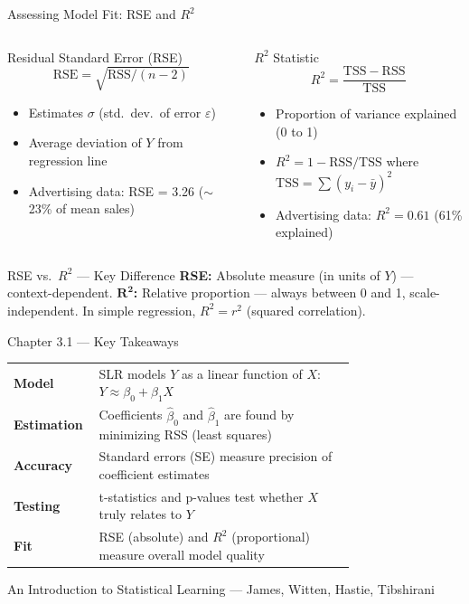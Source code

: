 \documentclass[ignorenonframetext,]{beamer}
\begin{document}
\begin{frame}{Assessing Model Fit: RSE and $R^2$}
\begin{columns}[T]
\begin{block}{Residual Standard Error (RSE)}
\footnotesize
$$\mathrm{RSE} = \sqrt{\mathrm{RSS}/(n-2)}$$
\begin{itemize}
\item Estimates $\sigma$ (std.\ dev.\ of error $\varepsilon$)
\item Average deviation of $Y$ from regression line
\item Advertising data: RSE = 3.26 ($\sim$23\% of mean sales)
\end{itemize}
\end{block}
\begin{block}{$R^2$ Statistic}
\footnotesize
$$R^2 = \frac{\mathrm{TSS} - \mathrm{RSS}}{\mathrm{TSS}}$$
\begin{itemize}
\item Proportion of variance explained (0 to 1)
\item $R^2 = 1 - \mathrm{RSS}/\mathrm{TSS}$ where $\mathrm{TSS} = \sum (y_i - \bar{y})^2$
\item Advertising data: $R^2 = 0.61$ (61\% explained)
\end{itemize}
\end{block}
\end{columns}

\begin{block}{RSE vs.\ $R^2$ --- Key Difference}
\footnotesize
\textbf{RSE:} Absolute measure (in units of $Y$) --- context-dependent. \textbf{$\bm{R^2}$:} Relative proportion --- always between 0 and 1, scale-independent. In simple regression, $R^2 = r^2$ (squared correlation).
\end{block}
\end{frame}

\begin{frame}{Chapter 3.1 --- Key Takeaways}
\renewcommand{\arraystretch}{1.6}
\begin{tabular}{@{}>{\bfseries}l p{0.75\linewidth}@{}}
\toprule
Model & SLR models $Y$ as a linear function of $X$: $Y \approx \beta_0 + \beta_1 X$ \\
Estimation & Coefficients $\hat\beta_0$ and $\hat\beta_1$ are found by minimizing RSS (least squares) \\
Accuracy & Standard errors (SE) measure precision of coefficient estimates \\
Testing & t-statistics and p-values test whether $X$ truly relates to $Y$ \\
Fit & RSE (absolute) and $R^2$ (proportional) measure overall model quality \\
\bottomrule
\end{tabular}

\vfill
\centering\footnotesize An Introduction to Statistical Learning --- James, Witten, Hastie, Tibshirani
\end{frame}
\end{document}
